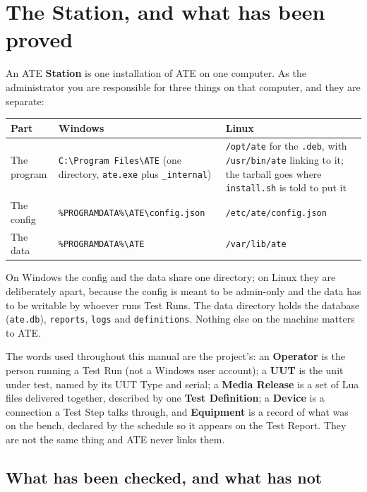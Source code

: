 \chapter{The Station, and what has been proved}\label{ch:station}

An ATE \textbf{Station} is one installation of ATE on one computer. As the administrator you are
responsible for three things on that computer, and they are separate:

\begin{center}
\footnotesize
\begin{tabular}{@{}>{\raggedright\arraybackslash}p{3.2cm}>{\raggedright\arraybackslash}p{5.2cm}>{\raggedright\arraybackslash}p{5.6cm}@{}}
\toprule
Part & Windows & Linux \\
\midrule
The program & \texttt{C:\textbackslash Program Files\textbackslash ATE} (one directory,
  \texttt{ate.exe} plus \texttt{\_internal}) & \texttt{/opt/ate} for the \texttt{.deb}, with
  \texttt{/usr/bin/ate} linking to it; the tarball goes where \texttt{install.sh} is told to put it \\
The config & \texttt{\%PROGRAMDATA\%\textbackslash ATE\textbackslash config.json} & \texttt{/etc/ate/config.json} \\
The data & \texttt{\%PROGRAMDATA\%\textbackslash ATE} & \texttt{/var/lib/ate} \\
\bottomrule
\end{tabular}
\end{center}

On Windows the config and the data share one directory; on Linux they are deliberately apart,
because the config is meant to be admin-only and the data has to be writable by whoever runs
Test Runs. The data directory holds the database (\texttt{ate.db}), \texttt{reports},
\texttt{logs} and \texttt{definitions}. Nothing else on the machine matters to ATE.

The words used throughout this manual are the project's: an \textbf{Operator} is the person
running a Test Run (not a Windows user account); a \textbf{UUT} is the unit under test, named by
its UUT Type and serial; a \textbf{Media Release} is a set of Lua files delivered together,
described by one \textbf{Test Definition}; a \textbf{Device} is a connection a Test Step talks
through, and \textbf{Equipment} is a record of what was on the bench, declared by the schedule so
it appears on the Test Report. They are not the same thing and ATE never links them.

\section{What has been checked, and what has not}

